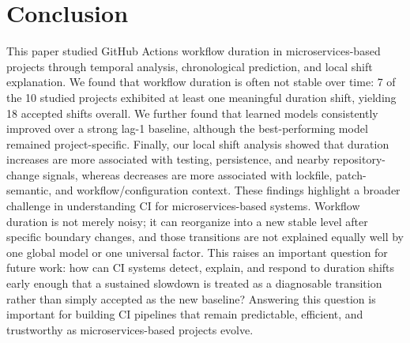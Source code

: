 \documentclass[conference]{IEEEconf}
\begin{document}
\section{Conclusion}
This paper studied GitHub Actions workflow duration in microservices-based projects through temporal analysis, chronological prediction, and local shift explanation. We found that workflow duration is often not stable over time: 7 of the 10 studied projects exhibited at least one meaningful duration shift, yielding 18 accepted shifts overall. We further found that learned models consistently improved over a strong lag-1 baseline, although the best-performing model remained project-specific. Finally, our local shift analysis showed that duration increases are more associated with testing, persistence, and nearby repository-change signals, whereas decreases are more associated with lockfile, patch-semantic, and workflow/configuration context. These findings highlight a broader challenge in understanding CI for microservices-based systems. Workflow duration is not merely noisy; it can reorganize into a new stable level after specific boundary changes, and those transitions are not explained equally well by one global model or one universal factor. This raises an important question for future work: how can CI systems detect, explain, and respond to duration shifts early enough that a sustained slowdown is treated as a diagnosable transition rather than simply accepted as the new baseline? Answering this question is important for building CI pipelines that remain predictable, efficient, and trustworthy as microservices-based projects evolve.





\balance
\end{document}
